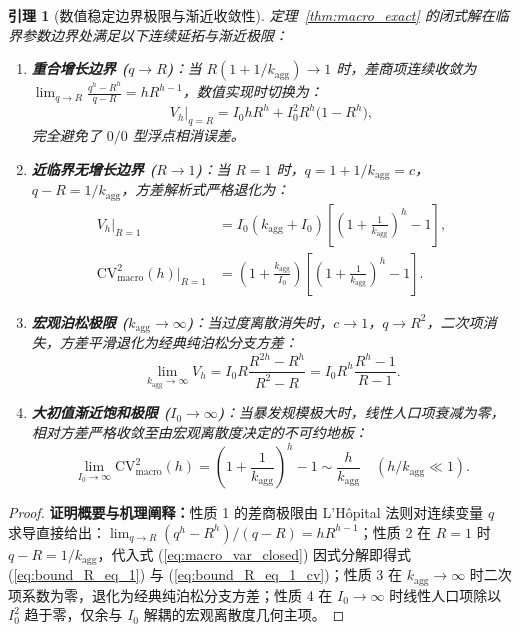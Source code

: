 \documentclass[11pt,a4paper]{article}
\theoremstyle{plain}
\newtheorem{lemma}{引理}
\theoremstyle{definition}
\begin{document}
\begin{lemma}[数值稳定边界极限与渐近收敛性]\label{lem:macro_boundaries}
定理~\ref{thm:macro_exact} 的闭式解在临界参数边界处满足以下连续延拓与渐近极限：
\begin{enumerate}
\item \textbf{重合增长边界 ($q \to R$)}：当 $R(1 + 1/k_{\text{agg}}) \to 1$ 时，差商项连续收敛为 $\lim_{q\to R} \frac{q^h - R^h}{q - R} = h R^{h-1}$，数值实现时切换为：
\begin{equation}
V_h \Big|_{q=R} = I_0 h R^h + I_0^2 R^h \bigl(1 - R^h\bigr), \label{eq:bound_q_eq_R}
\end{equation}
完全避免了 $0/0$ 型浮点相消误差。
\item \textbf{近临界无增长边界 ($R \to 1$)}：当 $R = 1$ 时，$q = 1 + 1/k_{\text{agg}} = c$，$q - R = 1/k_{\text{agg}}$，方差解析式严格退化为：
\begin{align}
V_h \Big|_{R=1} &= I_0 (k_{\text{agg}} + I_0) \left[ \left(1 + \frac{1}{k_{\text{agg}}}\right)^h - 1 \right], \label{eq:bound_R_eq_1} \\
\text{CV}^2_{\text{macro}}(h) \Big|_{R=1} &= \left(1 + \frac{k_{\text{agg}}}{I_0}\right) \left[ \left(1 + \frac{1}{k_{\text{agg}}}\right)^h - 1 \right]. \label{eq:bound_R_eq_1_cv}
\end{align}
\item \textbf{宏观泊松极限 ($k_{\text{agg}} \to \infty$)}：当过度离散消失时，$c \to 1$，$q \to R^2$，二次项消失，方差平滑退化为经典纯泊松分支方差：
\begin{equation}
\lim_{k_{\text{agg}}\to\infty} V_h = I_0 R \frac{R^{2h} - R^h}{R^2 - R} = I_0 R^h \frac{R^h - 1}{R - 1}.
\end{equation}
\item \textbf{大初值渐近饱和极限 ($I_0 \to \infty$)}：当暴发规模极大时，线性人口项衰减为零，相对方差严格收敛至由宏观离散度决定的不可约地板：
\begin{equation}
\lim_{I_0 \to \infty} \text{CV}^2_{\text{macro}}(h) = \left(1 + \frac{1}{k_{\text{agg}}}\right)^h - 1 \sim \frac{h}{k_{\text{agg}}} \quad (h/k_{\text{agg}} \ll 1).
\end{equation}
\end{enumerate}
\end{lemma}

\begin{proof}
\textbf{证明概要与机理阐释：}性质 1 的差商极限由 L'H\^opital 法则对连续变量 $q$ 求导直接给出：$\lim_{q\to R} (q^h-R^h)/(q-R) = h R^{h-1}$；性质 2 在 $R=1$ 时 $q-R = 1/k_{\text{agg}}$，代入式 (\ref{eq:macro_var_closed}) 因式分解即得式 (\ref{eq:bound_R_eq_1}) 与 (\ref{eq:bound_R_eq_1_cv})；性质 3 在 $k_{\text{agg}}\to\infty$ 时二次项系数为零，退化为经典纯泊松分支方差；性质 4 在 $I_0\to\infty$ 时线性人口项除以 $I_0^2$ 趋于零，仅余与 $I_0$ 解耦的宏观离散度几何主项。
\end{proof}
\end{document}
